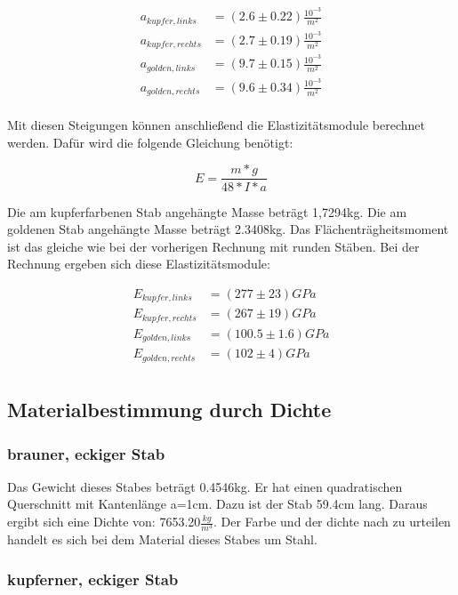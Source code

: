 \begin{align*}
    a_{kupfer, links} &= (2.6\pm 0.22) \frac{10^{-3}}{m^2}\\
    a_{kupfer, rechts} &= (2.7\pm 0.19) \frac{10^{-3}}{m^2}\\
    a_{golden, links} &= (9.7\pm 0.15) \frac{10^{-3}}{m^2}\\
    a_{golden, rechts} &= (9.6\pm 0.34) \frac{10^{-3}}{m^2}\\
\end{align*}

\noindent Mit diesen Steigungen können anschließend die Elastizitätsmodule berechnet werden. Dafür wird die folgende Gleichung benötigt:

\begin{displaymath}
    E = \frac{m*g}{48*I*a}
\end{displaymath}

\noindent Die am kupferfarbenen Stab angehängte Masse beträgt 1,7294kg. Die am goldenen Stab angehängte Masse beträgt 2.3408kg. Das Flächenträgheitsmoment ist das gleiche wie bei der vorherigen Rechnung mit runden Stäben. Bei der Rechnung ergeben sich diese Elastizitätsmodule: 

\begin{align*}
    E_{kupfer, links} &= (277\pm 23)GPa\\
    E_{kupfer, rechts} &= (267\pm 19)GPa\\
    E_{golden, links} &= (100.5\pm 1.6)GPa\\
    E_{golden, rechts} &= (102\pm 4)GPa\\
\end{align*}

\subsection{Materialbestimmung durch Dichte}

\subsubsection{brauner, eckiger Stab}

Das Gewicht dieses Stabes beträgt 0.4546kg. Er hat einen quadratischen Querschnitt mit Kantenlänge a=1cm. Dazu ist der Stab 59.4cm lang. Daraus ergibt sich eine Dichte von: 7653.20$\frac{kg}{m^3}$.
Der Farbe und der dichte nach zu urteilen handelt es sich bei dem Material dieses Stabes um Stahl.

\subsubsection{kupferner, eckiger Stab}

